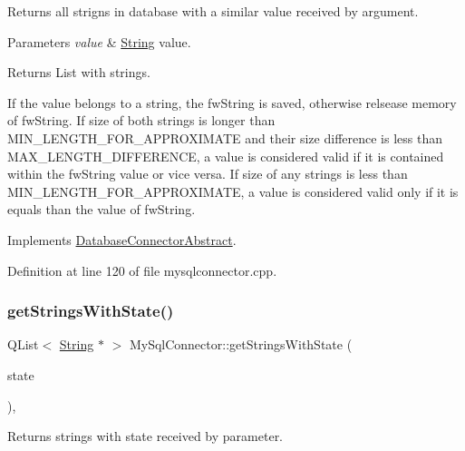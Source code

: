 Returns all strigns in database with a similar value received by argument. 


\begin{DoxyParams}{Parameters}
{\em value} & \mbox{\hyperlink{classString}{String}} value. \\
\hline
\end{DoxyParams}
\begin{DoxyReturn}{Returns}
List with strings. 
\end{DoxyReturn}
If the value belongs to a string, the fw\+String is saved, otherwise relsease memory of fw\+String. If size of both strings is longer than M\+I\+N\+\_\+\+L\+E\+N\+G\+T\+H\+\_\+\+F\+O\+R\+\_\+\+A\+P\+P\+R\+O\+X\+I\+M\+A\+TE and their size difference is less than M\+A\+X\+\_\+\+L\+E\+N\+G\+T\+H\+\_\+\+D\+I\+F\+F\+E\+R\+E\+N\+CE, a value is considered valid if it is contained within the fw\+String value or vice versa. If size of any strings is less than M\+I\+N\+\_\+\+L\+E\+N\+G\+T\+H\+\_\+\+F\+O\+R\+\_\+\+A\+P\+P\+R\+O\+X\+I\+M\+A\+TE, a value is considered valid only if it is equals than the value of fw\+String.

Implements \mbox{\hyperlink{classDatabaseConnectorAbstract_a5b0f30372ca105a94073267e969b74ee}{Database\+Connector\+Abstract}}.



Definition at line 120 of file mysqlconnector.\+cpp.

\mbox{\label{classMySqlConnector_a821c3dcebcd763df1700881cb47685d5}} 
\subsubsection{\texorpdfstring{get\+Strings\+With\+State()}{getStringsWithState()}}
{\footnotesize\ttfamily Q\+List$<$ \mbox{\hyperlink{classString}{String}} $\ast$ $>$ My\+Sql\+Connector\+::get\+Strings\+With\+State (\begin{DoxyParamCaption}\item[{const Q\+String}]{state }\end{DoxyParamCaption})\hspace{0.3cm}{\ttfamily [override]}, {\ttfamily [virtual]}}



Returns strings with state received by parameter. 



